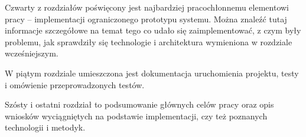 Czwarty z rozdziałów poświęcony jest najbardziej pracochłonnemu elementowi pracy -- implementacji ograniczonego prototypu systemu. Można znaleźć tutaj informacje szczegółowe na temat tego co udało się zaimplementować, z czym były problemu, jak sprawdziły się technologie i architektura wymieniona w rozdziale wcześniejszym.

W piątym rozdziale umieszczona jest dokumentacja uruchomienia projektu, testy i omówienie przeprowadzonych testów.

Szósty i ostatni rozdział to podsumowanie głównych celów pracy oraz opis wniosków wyciągniętych na podstawie implementacji, czy też poznanych technologii i metodyk.

\newpage
